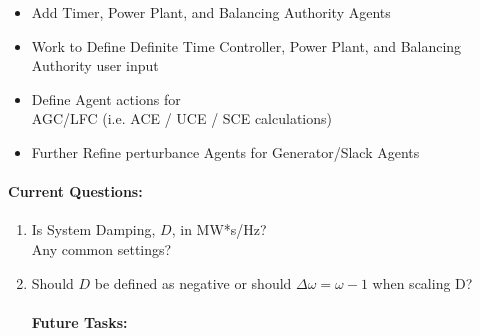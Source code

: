 \documentclass[12pt]{article}
\begin{document}
\begin{multicols}{2}
\begin{enumerate}
\begin{itemize}
		\item Add Timer, Power Plant, and Balancing Authority Agents
		\item Work to Define Definite Time Controller, Power Plant, and Balancing Authority user input
		
		\item Define Agent actions for \\ AGC/LFC (i.e. ACE / UCE / SCE calculations)
		\item Further Refine perturbance Agents for Generator/Slack Agents
		\end{itemize}
		

	\end{enumerate}
\vfill\null
\columnbreak
	\paragraph{Current Questions:}
	\begin{enumerate}

	\item Is System Damping, $D$, in MW*s/Hz? \\ Any common settings?
	\item Should $D$ be defined as negative or should $\Delta\omega = \omega-1$ when scaling D?
	
		






\paragraph{Future Tasks:} %
	\begin{enumerate}


\end{enumerate}
\end{enumerate}
\end{multicols}
\end{document}
